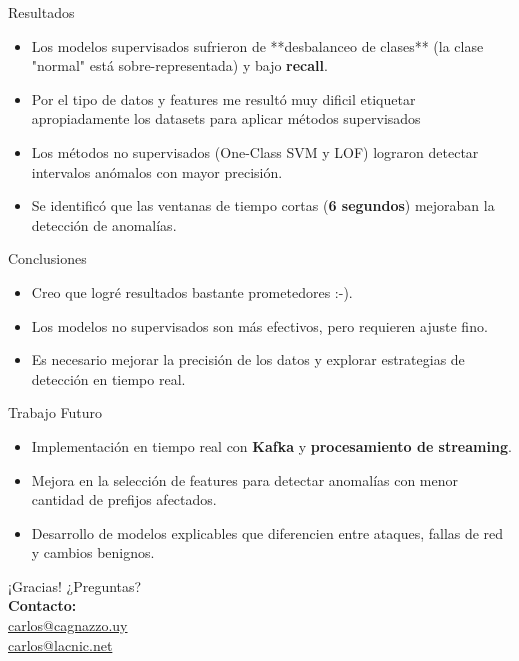 \documentclass{beamer}
\begin{document}
\begin{frame}{Resultados}
    \begin{itemize}
        \item Los modelos supervisados sufrieron de **desbalanceo de clases** (la clase "normal" está sobre-representada) y bajo \textbf{recall}.
        \item Por el tipo de datos y features me resultó muy dificil etiquetar apropiadamente los datasets para aplicar métodos supervisados
        \item Los métodos no supervisados (One-Class SVM y LOF) lograron detectar intervalos anómalos con mayor precisión.
        \item Se identificó que las ventanas de tiempo cortas (\textbf{6 segundos}) mejoraban la detección de anomalías.
    \end{itemize}
\end{frame}


\begin{frame}{Conclusiones}
    \begin{itemize}
        \item Creo que logré resultados bastante prometedores :-).
        \item Los modelos no supervisados son más efectivos, pero requieren ajuste fino.
        \item Es necesario mejorar la precisión de los datos y explorar estrategias de detección en tiempo real.
    \end{itemize}
\end{frame}

\begin{frame}{Trabajo Futuro}
    \begin{itemize}
        \item Implementación en tiempo real con \textbf{Kafka} y \textbf{procesamiento de streaming}.
        \item Mejora en la selección de features para detectar anomalías con menor cantidad de prefijos afectados.
        \item Desarrollo de modelos explicables que diferencien entre ataques, fallas de red y cambios benignos.
    \end{itemize}
\end{frame}

\begin{frame}{¡Gracias!}
    \centering
    ¿Preguntas? \\
    \vspace{1cm}
    \textbf{Contacto:} \\
    \href{mailto:carlos@cagnazzo.uy}{carlos@cagnazzo.uy} \\
    \href{mailto:carlos@lacnic.net}{carlos@lacnic.net}
\end{frame}
\end{document}
